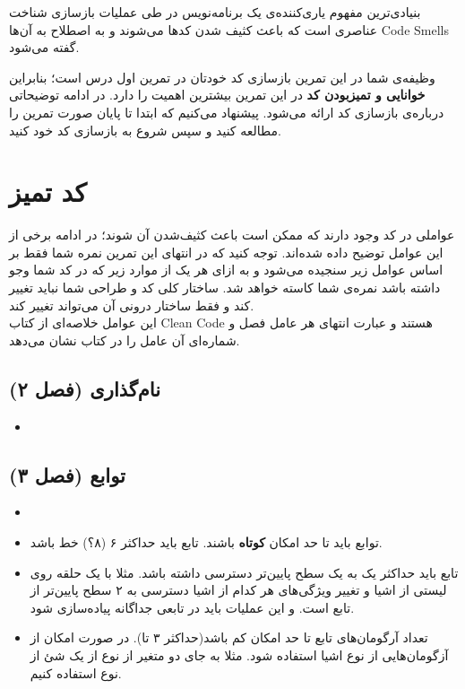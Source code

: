 \documentclass{utap}
\begin{document}
بنیادی‌ترین مفهوم یاری‌کننده‌ی یک برنامه‌نویس در طی عملیات بازسازی شناخت عناصری است که باعث کثیف شدن کدها می‌شوند و به اصطلاح به آن‌ها Code Smells گفته می‌شود.

وظیفه‌ی شما در این تمرین بازسازی کد خودتان در تمرین اول درس است؛ بنابراین \textbf{خوانایی و تمیزبودن کد} در این تمرین بیشترین اهمیت را دارد. در ادامه توضیحاتی درباره‌ی بازسازی کد اراﺋﻪ می‌شود. پیشنهاد می‌کنیم که ابتدا تا پایان صورت تمرین را مطالعه کنید و سپس شروع به بازسازی کد خود کنید.
\newpage
\section{کد تمیز}
عواملی در کد وجود دارند که ممکن است باعث کثیف‌شدن آن شوند؛ در ادامه برخی از این عوامل توضیح داده شده‌اند. توجه کنید که در انتهای این تمرین نمره شما فقط بر اساس عوامل زیر سنجیده می‌شود و به ازای هر یک از موارد زیر که در کد شما وجو داشته باشد نمره‌ی شما کاسته خواهد شد. ساختار کلی کد و طراحی شما نباید تغییر کند و فقط ساختار درونی آن می‌تواند تغییر کند.\\
این عوامل خلاصه‌ای از کتاب Clean Code هستند و عبارت انتهای هر عامل فصل و شماره‌ای آن عامل را در کتاب نشان می‌دهد.

\subsection{نام‌گذاری (فصل ۲)}
  \begin{itemize}
        \item
    \end{itemize}

\subsection{توابع (فصل ۳)}
  \begin{itemize}
	\item
        \item 
توابع باید تا حد امکان \textbf{کوتاه} باشند.
تابع باید حداکثر ۶ (۸‌؟) خط باشد.
	\item
تابع باید حداکثر یک به یک سطح پایین‌تر دسترسی داشته باشد. مثلا با یک حلقه روی لیستی از اشیا و تغییر ویژگی‌های هر کدام از اشیا دسترسی به ۲ سطح پایین‌تر از تابع است. و این عملیات باید در تابعی جداگانه پیاده‌سازی شود.
	\item
تعداد آرگومان‌های تابع تا حد امکان کم باشد(حداکثر ۳ تا). در صورت امکان از آزگومان‌هایی از نوع اشیا استفاده شود. مثلا به جای دو متغیر از نوع  از یک شئ از نوع   استفاده کنیم.
    \end{itemize}
\end{document}
